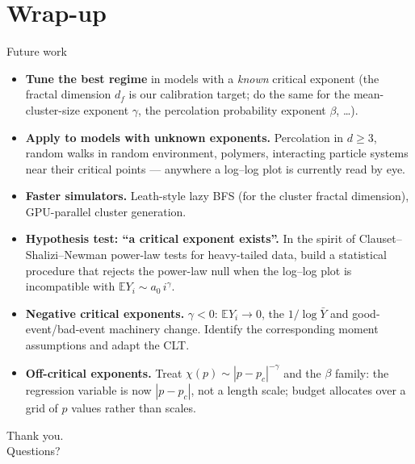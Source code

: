 \documentclass[10pt, aspectratio=169, xcolor={table}]{beamer}
\newcommand{\E}{\mathbb{E}}
\begin{document}
\section{Wrap-up}

\begin{frame}{Future work}
  \begin{itemize}\setlength{\itemsep}{4pt}
    \item \textbf{Tune the best regime} in models with a
          \emph{known} critical exponent (the fractal dimension
          $d_f$ is our calibration target; do the same for the
          mean-cluster-size exponent $\gamma$, the percolation
          probability exponent $\beta$, \ldots).
    \item \textbf{Apply to models with unknown exponents.}
          Percolation in $d \ge 3$, random walks in random
          environment, polymers, interacting particle systems near
          their critical points --- anywhere a log--log plot is
          currently read by eye.
    \item \textbf{Faster simulators.} Leath-style lazy BFS (for the 
          cluster fractal dimension), GPU-parallel cluster
          generation.
    \item \textbf{Hypothesis test: ``a critical exponent exists''.}
          In the spirit of Clauset--Shalizi--Newman power-law tests
          for heavy-tailed data, build a statistical procedure
          that rejects the power-law null when the log--log plot is
          incompatible with $\E Y_i \sim a_0\,i^{\gamma}$.
    \item \textbf{Negative critical exponents.} $\gamma < 0$:
          $\E Y_i \to 0$, the $1/\log\bar Y$ and good-event/bad-event
          machinery change. Identify the corresponding moment
          assumptions and adapt the CLT.
    \item \textbf{Off-critical exponents.} Treat
          $\chi(p)\sim|p-p_c|^{-\gamma}$ and the $\beta$ family:
          the regression variable is now $|p-p_c|$, not a length
          scale; budget allocates over a grid of $p$ values rather
          than scales.
  \end{itemize}
\end{frame}

\begin{frame}[plain]
  \vfill
  \begin{center}
    {\Huge Thank you.}\\[1em]
    {\large Questions?}
  \end{center}
  \vfill
\end{frame}
\end{document}

